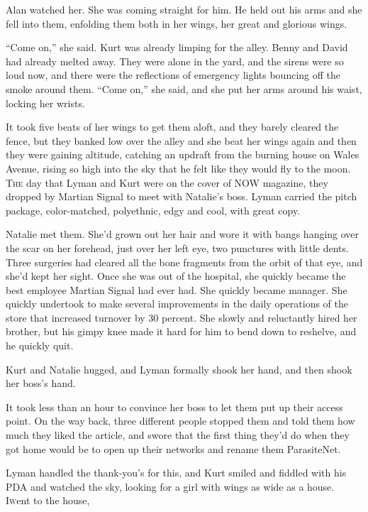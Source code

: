 \documentclass{article}
\begin{document}
Alan watched her.  She was coming straight for him.  He held out his
arms and she fell into them, enfolding them both in her wings, her
great and glorious wings.

``Come on,'' she said.  Kurt was already limping for the alley.  Benny
and David had already melted away.  They were alone in the yard, and
the sirens were so loud now, and there were the reflections of
emergency lights bouncing off the smoke around them.  ``Come on,'' she
said, and she put her arms around his waist, locking her wrists.

It took five beats of her wings to get them aloft, and they barely
cleared the fence, but they banked low over the alley and she beat her
wings again and then they were gaining altitude, catching an updraft
from the burning house on Wales Avenue, rising so high into the sky
that he felt like they would fly to the moon.
\\
\lettrine[lines=3, lhang=.5, nindent=0pt, findent=2pt]{T}{he} day that Lyman and Kurt were on the cover of NOW magazine, they
dropped by Martian Signal to meet with Natalie's boss.  Lyman carried
the pitch package, color-matched, polyethnic, edgy and cool, with
great copy.

Natalie met them.  She'd grown out her hair and wore it with bangs
hanging over the scar on her forehead, just over her left eye, two
punctures with little dents.  Three surgeries had cleared all the bone
fragments from the orbit of that eye, and she'd kept her sight.  Once
she was out of the hospital, she quickly became the best employee
Martian Signal had ever had.  She quickly became manager.  She quickly
undertook to make several improvements in the daily operations of the
store that increased turnover by 30 percent.  She slowly and
reluctantly hired her brother, but his gimpy knee made it hard for him
to bend down to reshelve, and he quickly quit.

Kurt and Natalie hugged, and Lyman formally shook her hand, and then
shook her boss's hand.

It took less than an hour to convince her boss to let them put up
their access point.  On the way back, three different people stopped
them and told them how much they liked the article, and swore that the
first thing they'd do when they got home would be to open up their
networks and rename them ParasiteNet.

Lyman handled the thank-you's for this, and Kurt smiled and fiddled
with his PDA and watched the sky, looking for a girl with wings as
wide as a house.
\\
\lettrine[lines=3, lhang=.5, nindent=0pt, findent=2pt]{I} went to the
house,
\end{document}

